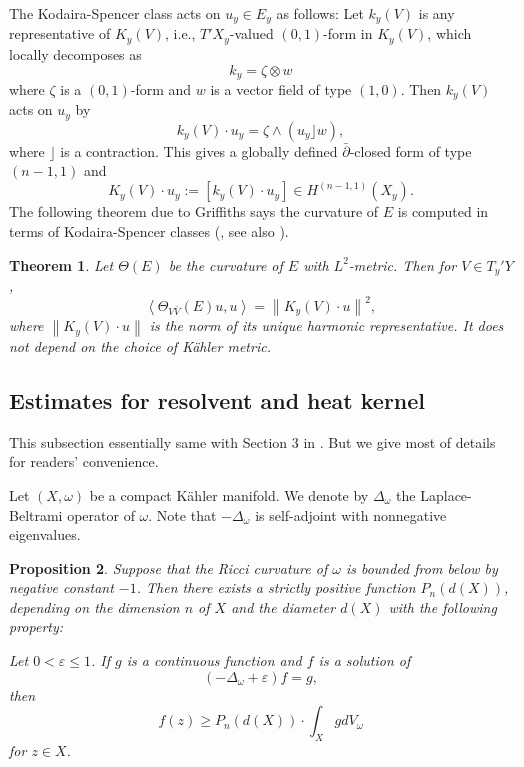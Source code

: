 \documentclass{amsart}
\newtheorem{theorem}{Theorem}[section]
\newtheorem{proposition}[theorem]{Proposition}
\theoremstyle{definition}
\numberwithin{equation}{section}
\begin{document}
The Kodaira-Spencer class acts on $u_y\in E_y$ as follows: Let $k_y(V)$ is any representative of $K_y(V)$, i.e., $T'X_y$-valued $(0,1)$-form in $K_y(V)$, which locally decomposes as 
\begin{equation*}
k_y=\zeta\otimes w
\end{equation*}
where $\zeta$ is a $(0,1)$-form and $w$ is a vector field of type $(1,0)$. Then $k_y(V)$ acts on $u_y$ by
\begin{equation*}
k_y(V)\cdot u_y=\zeta\wedge(u_y\rfloor w),
\end{equation*}
where $\rfloor$ is a contraction. This gives a globally defined $\bar\partial$-closed form of type $(n-1,1)$ and
\begin{equation*}
K_y(V)\cdot u_y
:=
{\left[{k_y(V)\cdot u_y
}\right]}
\in H^{(n-1,1)}(X_y).
\end{equation*}
The following theorem due to Griffiths says the curvature of $E$ is computed in terms of Kodaira-Spencer classes (\cite{Griffiths}, see also \cite{Berndtsson2}).

\begin{theorem}
Let $\Theta(E)$ be the curvature of $E$ with $L^2$-metric. Then for $V\in T_y'Y$,
\begin{equation}\label{E:Griffiths}
{\left\langle{{\Theta_{V\bar V}(E)u,u}}\right\rangle}={\left\|{K_y(V)\cdot u}\right\|}^2,
\end{equation}
where ${\left\|{K_y(V)\cdot u}\right\|}$ is the norm of its unique harmonic representative. It does not depend on the choice of K\"ahler metric.
\end{theorem}

\subsection{Estimates for resolvent and heat kernel}

This subsection essentially same with Section 3 in \cite{Schumacher}. But we give most of details for readers' convenience.

Let $(X,\omega)$ be a compact K\"ahler manifold. We denote by $\Delta_\omega$ the Laplace-Beltrami operator of $\omega$. Note that $-\Delta_\omega$ is self-adjoint with nonnegative eigenvalues.

\begin{proposition} \label{P:heat_kernel}
Suppose that the Ricci curvature of $\omega$ is bounded from below by negative constant $-1$. Then there exists a strictly positive function $P_n(d(X))$, depending on the dimension $n$ of $X$ and the diameter $d(X)$ with the following property:

Let $0<{\varepsilon}\le1$. If $g$ is a continuous function and $f$ is a solution of
\begin{equation}\label{E:pde_kernel}
(-\Delta_\omega+{\varepsilon})f=g,
\end{equation}
then
\begin{equation*}
f(z)\ge
P_n(d(X))\cdot\int_Xg dV_\omega
\end{equation*}
for $z\in X$.
\end{proposition}
\end{document}
